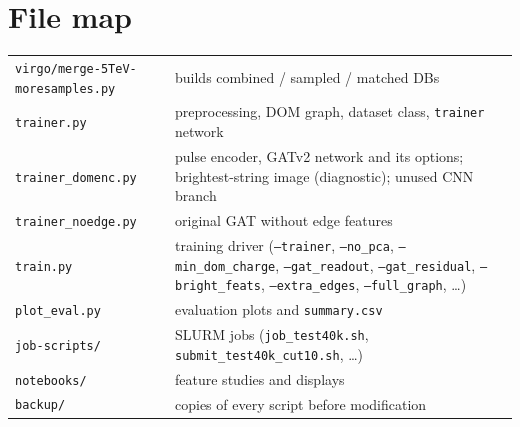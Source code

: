 \documentclass[11pt,a4paper]{article}
\newcommand{\code}[1]{\texttt{#1}}
\begin{document}
\section{File map}
\begin{tabularx}{\textwidth}{lY}
\toprule
\code{virgo/merge-5TeV-moresamples.py} & builds combined / sampled / matched DBs\\
\code{trainer.py} & preprocessing, DOM graph, dataset class, \code{trainer} network\\
\code{trainer\_domenc.py} & pulse encoder, GATv2 network and its options; brightest-string image (diagnostic);
  unused CNN branch\\
\code{trainer\_noedge.py} & original GAT without edge features\\
\code{train.py} & training driver (\code{--trainer}, \code{--no\_pca}, \code{--min\_dom\_charge}, \code{--gat\_readout},
  \code{--gat\_residual}, \code{--bright\_feats}, \code{--extra\_edges}, \code{--full\_graph}, \dots)\\
\code{plot\_eval.py} & evaluation plots and \code{summary.csv}\\
\code{job-scripts/} & SLURM jobs (\code{job\_test40k.sh}, \code{submit\_test40k\_cut10.sh}, \dots)\\
\code{notebooks/} & feature studies and displays\\
\code{backup/} & copies of every script before modification\\
\bottomrule
\end{tabularx}
\end{document}

